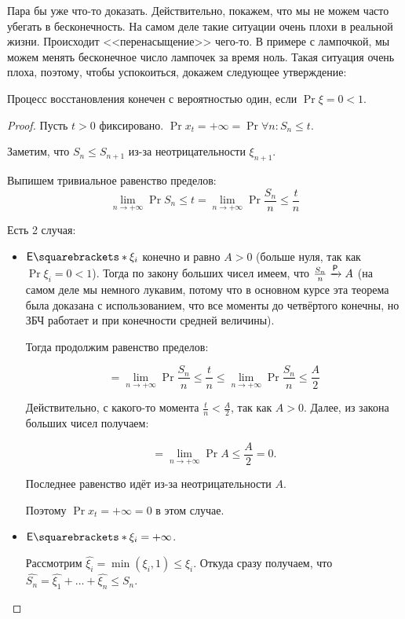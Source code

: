 Пара бы уже что-то доказать. Действительно, покажем, что мы не можем
часто убегать в бесконечность. На самом деле такие ситуации очень плохи в реальной
жизни. Происходит <<перенасыщение>> чего-то. В примере с лампочкой, мы можем менять
бесконечное число лампочек за время ноль. Такая ситуация очень плоха, поэтому,
чтобы успокоиться, докажем следующее утверждение:

\begin{theorem}
  Процесс восстановления конечен с вероятностью один, если $\Pr{\xi = 0} < 1$.
\end{theorem}

\begin{proof}
  Пусть $t > 0$ фиксировано. $\Pr{x_t = +\infty} = \Pr{\forall n : S_n \leq t}$.

  Заметим, что $S_n \leq S_{n + 1}$ из-за неотрицательности $\xi_{n + 1}$.

  Выпишем тривиальное равенство пределов:
  \[
    \lim\limits_{n \to +\infty} \Pr{S_n \leq t} = \lim\limits_{n \to +\infty} \Pr{\frac{S_n}{n} \leq \frac{t}{n}}
  \]

  Есть 2 случая:

  \begin{itemize}
    \item $\E{\xi_i}$ конечно и равно $A > 0$ (больше нуля, так как $\Pr{\xi_i = 0} < 1$).
    Тогда по закону больших чисел имеем,
    что $\frac{S_n}{n} \prto A$ (на самом деле мы немного лукавим, потому что
    в основном курсе эта теорема была доказана с использованием, что все моменты до четвёртого конечны,
    но ЗБЧ работает и при конечности средней величины).

    Тогда продолжим равенство пределов:

    \[
      = \lim\limits_{n \to +\infty} \Pr{\frac{S_n}{n} \leq \frac{t}{n}} \leq
      \lim\limits_{n \to +\infty} \Pr{\frac{S_n}{n} \leq \frac{A}{2}}
    \]

    Действительно, с какого-то момента $\frac{t}{n} < \frac{A}{2}$, так как
    $A > 0$. Далее, из закона больших чисел получаем:

    \[
      = \lim\limits_{n \to +\infty} \Pr{A \leq \frac{A}{2}} = 0.
    \]

    Последнее равенство идёт из-за неотрицательности $A$.

    Поэтому $\Pr{x_t = +\infty} = 0$ в этом случае.

    \item $\E{\xi_i} = +\infty$.

    Рассмотрим $\hat{\xi_i} = \min(\xi_i, 1) \leq \xi_i$. Откуда сразу получаем,
    что $\hat{S_n} = \hat{\xi_1} + \ldots + \hat{\xi_n} \leq S_n$.


\end{itemize}
\end{proof}
